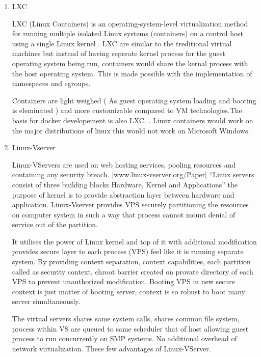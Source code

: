 \begin{enumerate}
\item {} 
LXC

LXC (Linux Containers) is an operating-system-level
virtualization method for running multiple isolated Linux systems
(containers) on a control host using a single Linux kernel
\label{\detokenize{i524/technologies:id630}}{\hyperref[\detokenize{i524/technologies:www-wiki-lxc}]{\sphinxcrossref{{[}545{]}}}}. LXC are similar to the treditional virtual
machines but instead of having seperate kernel process for the
guest operating system being run, containers would share the
kernal process with the host operating system. This is made
possible with the implementation of namespaces and
cgroups. \label{\detokenize{i524/technologies:id631}}{\hyperref[\detokenize{i524/technologies:www-jpablo}]{\sphinxcrossref{{[}546{]}}}}

Containers are light weighed ( As guest operating system
loading and booting is eleminated ) and more customizable
compared to VM technologies.The basis for docker developement
is also LXC. \label{\detokenize{i524/technologies:id632}}{\hyperref[\detokenize{i524/technologies:www-infoworld}]{\sphinxcrossref{{[}547{]}}}}. Linux containers would
work on the major distributions of linux this would not work
on Microsoft Windows.

\item {} 
Linux-Vserver

Linux-VServers are used on web hosting services, pooling
resources and containing any security
breach. {[}www.linux-vserver.org/Paper{]} “Linux servers
consist of three building blocks Hardware, Kernel and
Applications” the purpose of kernel is to provide abstraction
layer between hardware and application. Linux-Vserver provides
VPS securely partitioning the resources on computer system in
such a way that process cannot mount denial of service out of the
partition.

It utilises the power of Linux kernel and top of it with
additional modification provides secure layer to each process
(VPS) feel like it is running separate system.  By providing
context separation, context capabilities, each partition called
as security context, chroot barrier created on provate directory
of each VPS to prevent unauthorized modification. Booting VPS in
new secure context is just matter of booting server, context is
so robust to boot many server simultaneously.

The virtual servers shares same system calls, shares common file
system, process within VS are queued to same scheduler that of
host allowing guest process to run concurrently on SMP
systems. No additional overhead of network virtualization.  These
few advantages of Linux-VServer.


\end{enumerate}
